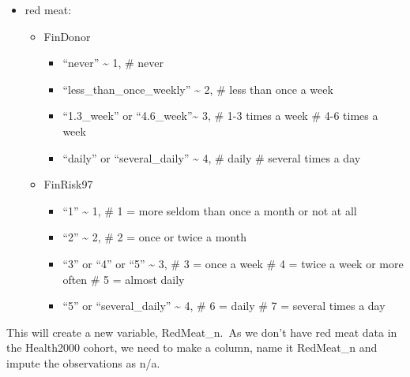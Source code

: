\documentclass[
]{article}
\providecommand{\tightlist}{%
  \setlength{\itemsep}{0pt}\setlength{\parskip}{0pt}}
\begin{document}
\begin{itemize}
\tightlist
\item
  red meat:

  \begin{itemize}
  \tightlist
  \item
    FinDonor

    \begin{itemize}
    \tightlist
    \item
      ``never'' \textasciitilde{} 1, \# never
    \item
      ``less\_than\_once\_weekly'' \textasciitilde{} 2, \# less than
      once a week
    \item
      ``1.3\_week'' or ``4.6\_week''\textasciitilde{} 3, \# 1-3 times a
      week \# 4-6 times a week
    \item
      ``daily'' or ``several\_daily'' \textasciitilde{} 4, \# daily \#
      several times a day
    \end{itemize}
  \item
    FinRisk97

    \begin{itemize}
    \tightlist
    \item
      ``1'' \textasciitilde{} 1, \# 1 = more seldom than once a month or
      not at all
    \item
      ``2'' \textasciitilde{} 2, \# 2 = once or twice a month
    \item
      ``3'' or ``4'' or ``5'' \textasciitilde{} 3, \# 3 = once a week \#
      4 = twice a week or more often \# 5 = almost daily
    \item
      ``5'' or ``several\_daily'' \textasciitilde{} 4, \# 6 = daily \# 7
      = several times a day
    \end{itemize}
  \end{itemize}
\end{itemize}

This will create a new variable, RedMeat\_n.~As we don't have red meat
data in the Health2000 cohort, we need to make a column, name it
RedMeat\_n and impute the observations as n/a.
\end{document}
